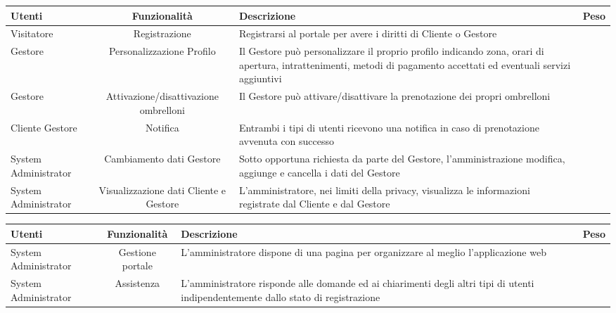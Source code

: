 \documentclass[a4paper]{article}
\begin{document}
\newpage
\begin{tabularx}{\textwidth}{p{}cXc}

\toprule
Utenti & Funzionalità & Descrizione & Peso \\

\midrule
Visitatore & Registrazione & Registrarsi al portale per avere i diritti di Cliente o Gestore\\

\midrule
Gestore & Personalizzazione Profilo & Il Gestore può personalizzare il proprio profilo indicando zona, orari di apertura, intrattenimenti, metodi di pagamento accettati ed eventuali servizi aggiuntivi\\

\midrule
Gestore & Attivazione/disattivazione ombrelloni & Il Gestore può attivare/disattivare la prenotazione dei propri ombrelloni\\

\midrule
Cliente \newline Gestore & Notifica & Entrambi i tipi di utenti ricevono una notifica in caso di prenotazione avvenuta con successo\\

\midrule
System Administrator & Cambiamento dati Gestore & Sotto opportuna richiesta da parte del Gestore, l'amministrazione modifica, aggiunge e cancella i dati del Gestore\\

\midrule
System Administrator & Visualizzazione dati Cliente e Gestore & L'amministratore, nei limiti della privacy, visualizza le informazioni registrate dal Cliente e dal Gestore\\
\bottomrule
\end{tabularx}

\newpage
\begin{tabularx}{\textwidth}{p{}cXc}
\toprule
Utenti & Funzionalità & Descrizione & Peso \\

\midrule
System Administrator & Gestione portale & L'amministratore dispone di una pagina per organizzare al meglio l'applicazione web\\

\midrule
System Administrator & Assistenza & L'amministratore risponde alle domande ed ai chiarimenti degli altri tipi di utenti indipendentemente dallo stato di registrazione\\
\bottomrule

\end{tabularx}
\end{document}
